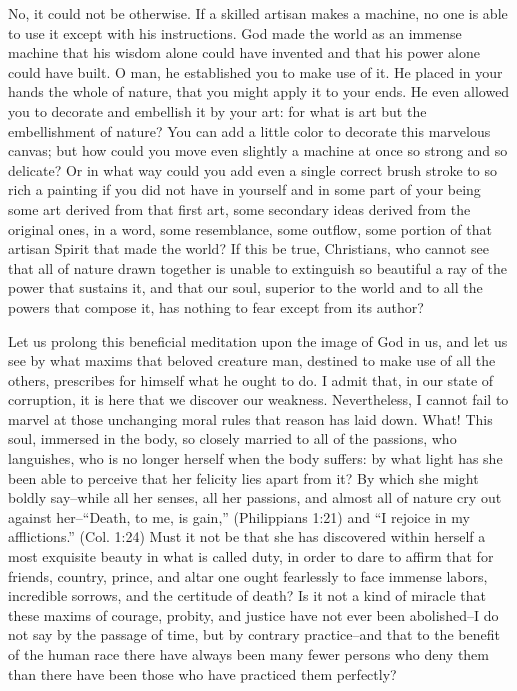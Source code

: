 \documentclass[10pt, twoside]{article}
\begin{document}
No, it could not be otherwise. If a skilled artisan makes a machine, no one is able to use it except with his instructions. God made the world as an immense machine that his wisdom alone could have invented and that his power alone could have built. O man, he established you to make use of it. He placed in your hands the whole of nature, that you might apply it to your ends. He even allowed you to decorate and embellish it by your art: for what is art but the embellishment of nature? You can add a little color to decorate this marvelous canvas; but how could you move even slightly a machine at once so strong and so delicate? Or in what way could you add even a single correct brush stroke to so rich a painting if you did not have in yourself and in some part of your being some art derived from that first art, some secondary ideas derived from the original ones, in a word, some resemblance, some outflow, some portion of that artisan Spirit that made the world? If this be true, Christians, who cannot see that all of nature drawn together is unable to extinguish so beautiful a ray of the power that sustains it, and that our soul, superior to the world and to all the powers that compose it, has nothing to fear except from its author?

Let us prolong this beneficial meditation upon the image of God in us, and let us see by what maxims that beloved creature man, destined to make use of all the others, prescribes for himself what he ought to do. I admit that, in our state of corruption, it is here that we discover our weakness. Nevertheless, I cannot fail to marvel at those unchanging moral rules that reason has laid down. What! This soul, immersed in the body, so closely married to all of the passions, who languishes, who is no longer herself when the body suffers: by what light has she been able to perceive that her felicity lies apart from it? By which she might boldly say--while all her senses, all her passions, and almost all of nature cry out against her--``Death, to me, is gain,'' (Philippians 1:21) and ``I rejoice in my afflictions.'' (Col. 1:24) Must it not be that she has discovered within herself a most exquisite beauty in what is called duty, in order to dare to affirm that for friends, country, prince, and altar one ought fearlessly to face immense labors, incredible sorrows, and the certitude of death? Is it not a kind of miracle that these maxims of courage, probity, and justice have not ever been abolished--I do not say by the passage of time, but by contrary practice--and that to the benefit of the human race there have always been many fewer persons who deny them than there have been those who have practiced them perfectly?
\end{document}
